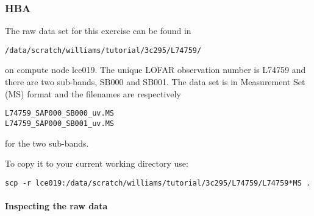 \subsubsection{HBA}
The raw data set for this exercise can be found in
\begin{verbatim}
/data/scratch/williams/tutorial/3c295/L74759/
\end{verbatim}
on compute node lce019. The unique LOFAR observation number is
L74759
and there are two sub-bands,
SB000
and 
SB001.
The data set is in Measurement Set (MS) format and the filenames are respectively
\begin{verbatim}
L74759_SAP000_SB000_uv.MS
L74759_SAP000_SB001_uv.MS
\end{verbatim}
for the two sub-bands.

To copy it to your current working directory use:
\begin{verbatim}
scp -r lce019:/data/scratch/williams/tutorial/3c295/L74759/L74759*MS .
\end{verbatim}


\paragraph{Inspecting the raw data}\mbox{}\\

